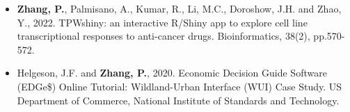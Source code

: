 \begin{itemize}
\item \textbf{Zhang, P.}, Palmisano, A., Kumar, R., Li, M.C., Doroshow, J.H. and Zhao, Y., 2022. TPWshiny: an interactive R/Shiny app to explore cell line transcriptional responses to anti-cancer drugs. Bioinformatics, 38(2), pp.570-572.
\item Helgeson, J.F. and \textbf{Zhang, P.}, 2020. Economic Decision Guide Software (EDGe\$) Online Tutorial: Wildland-Urban Interface (WUI) Case Study. US Department of Commerce, National Institute of Standards and Technology.
\end{itemize}